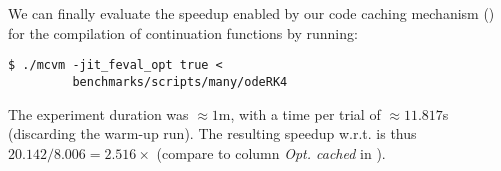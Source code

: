 We can finally evaluate the speedup enabled by our code caching mechanism () for the compilation of continuation functions by running:
\begin{small}
\begin{verbatim}
$ ./mcvm -jit_feval_opt true <
         benchmarks/scripts/many/odeRK4
\end{verbatim}
\end{small}

\noindent The experiment duration was $\approx1$m, with a time per trial of $\approx11.817$s (discarding the warm-up run). The resulting speedup w.r.t. is thus $20.142/8.006=2.516\times$ (compare to column {\em Opt. cached} in ).

